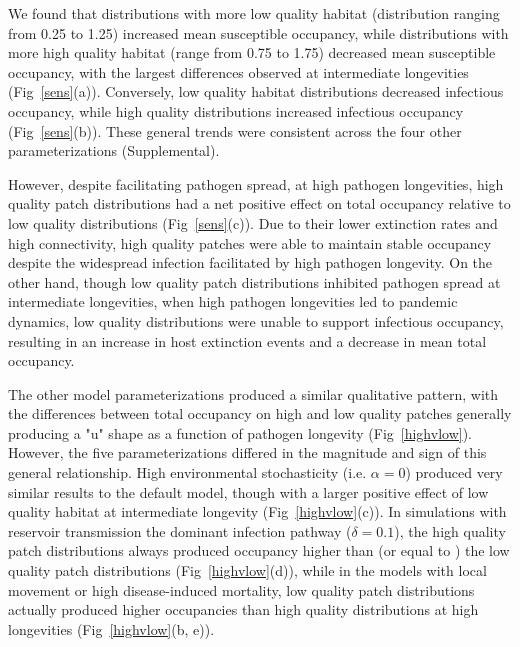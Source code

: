 \documentclass{article}
\begin{document}
We found that distributions with more low quality habitat (distribution ranging from 0.25 to 1.25) increased mean susceptible occupancy, while distributions with more high quality habitat (range from 0.75 to 1.75) decreased mean susceptible occupancy, with the largest differences observed at intermediate longevities (Fig~\ref{sens}(a)).  Conversely, low quality habitat distributions decreased infectious occupancy, while high quality distributions increased infectious occupancy (Fig~\ref{sens}(b)).  These general trends were consistent across the four other parameterizations (Supplemental).  

However, despite facilitating pathogen spread, at high pathogen longevities, high quality patch distributions had a net positive effect on total occupancy relative to low quality distributions (Fig~\ref{sens}(c)).  Due to their lower extinction rates and high connectivity, high quality patches were able to maintain stable occupancy despite the widespread infection facilitated by high pathogen longevity.  On the other hand, though low quality patch distributions inhibited pathogen spread at intermediate longevities, when high pathogen longevities led to pandemic dynamics, low quality distributions were unable to support infectious occupancy, resulting in an increase in host extinction events and a decrease in mean total occupancy.  

The other model parameterizations produced a similar qualitative pattern, with the differences between total occupancy on high and low quality patches generally producing a "u" shape as a function of pathogen longevity (Fig~\ref{highvlow}).  However, the five parameterizations differed in the magnitude and sign of this general relationship.  High environmental stochasticity (i.e. $\alpha = 0$) produced very similar results to the default model, though with a larger positive effect of low quality habitat at intermediate longevity (Fig~\ref{highvlow}(c)).  In simulations with reservoir transmission the dominant infection pathway ($\delta = 0.1$), the high quality patch distributions always produced occupancy higher than (or equal to ) the low quality patch distributions (Fig~\ref{highvlow}(d)), while in the models with local movement or high disease-induced mortality, low quality patch distributions actually produced higher occupancies than high quality distributions at high longevities (Fig~\ref{highvlow}(b, e)).
\end{document}
